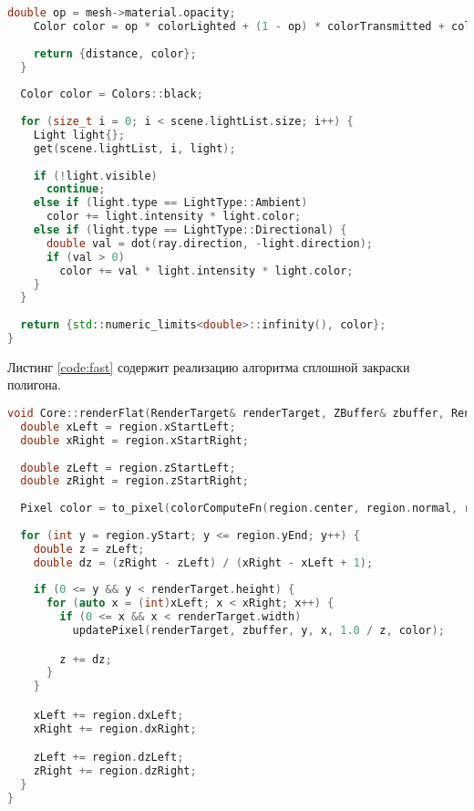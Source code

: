 \begin{lstlisting}[language=C++,label=code:ray-trace,caption=Реализация алгоритма трассировки лучей]
    double op = mesh->material.opacity;
    Color color = op * colorLighted + (1 - op) * colorTransmitted + colorReflected;
  
    return {distance, color};
  }
  
  Color color = Colors::black;
  
  for (size_t i = 0; i < scene.lightList.size; i++) {
    Light light{};
    get(scene.lightList, i, light);
    
    if (!light.visible)
      continue;
    else if (light.type == LightType::Ambient)
      color += light.intensity * light.color;
    else if (light.type == LightType::Directional) {
      double val = dot(ray.direction, -light.direction);
      if (val > 0)
        color += val * light.intensity * light.color;
    }
  }
  
  return {std::numeric_limits<double>::infinity(), color};
}
\end{lstlisting}

Листинг \ref{code:fast} содержит реализацию алгоритма сплошной закраски полигона.

\begin{lstlisting}[language=C++,label=code:fast,caption=Реализация алгоритма сплошной закраски полигона]
void Core::renderFlat(RenderTarget& renderTarget, ZBuffer& zbuffer, RenderRegion region, ColorComputeFn colorComputeFn) {
  double xLeft = region.xStartLeft;
  double xRight = region.xStartRight;
	
  double zLeft = region.zStartLeft;
  double zRight = region.zStartRight;
	
  Pixel color = to_pixel(colorComputeFn(region.center, region.normal, region.meshPtr->material));
	
  for (int y = region.yStart; y <= region.yEnd; y++) {
    double z = zLeft;
    double dz = (zRight - zLeft) / (xRight - xLeft + 1);
		
    if (0 <= y && y < renderTarget.height) {
      for (auto x = (int)xLeft; x < xRight; x++) {
        if (0 <= x && x < renderTarget.width)
          updatePixel(renderTarget, zbuffer, y, x, 1.0 / z, color);

        z += dz;
      }
    }

    xLeft += region.dxLeft;
    xRight += region.dxRight;

    zLeft += region.dzLeft;
    zRight += region.dzRight;
  }
}
\end{lstlisting}
